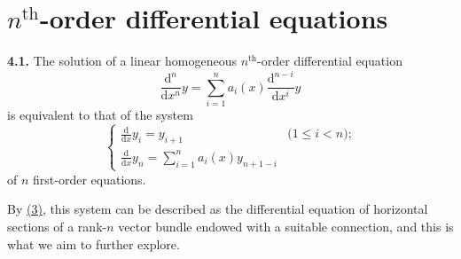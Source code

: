 \documentclass{report}
\newenvironment{rmenv}[1]
  {\phantomsection\par\medskip\noindent\textbf{#1.}\rmfamily}
  {\medskip}
\newcommand{\dd}{\mathrm{d}}
\renewcommand{\leq}{\leqslant}
\begin{document}
\section{\texorpdfstring{$n^\mathrm{th}$}{nth}-order differential equations}
\label{I.4}

\begin{rmenv}{4.1}
\label{I.4.1}
  The solution of a linear homogeneous $n^\mathrm{th}$-order differential equation
  \[
  \label{I.4.1.1}
    \frac{\dd^n}{\dd x^n}y = \sum_{i=1}^n a_i(x) \frac{\dd^{n-i}}{\dd x^i}y
  \tag{4.1.1}
  \]
  is equivalent to that of the system
  \[
  \label{I.4.1.2}
    \begin{cases}
      \frac{\dd}{\dd x}y_i
      = y_{i+1} &\mbox{($1\leq i<n$);}
    \\\frac{\dd}{\dd x}y_n
      = \sum_{i=1}^n a_i(x) y_{n+1-i}
    \end{cases}
  \tag{4.1.2}
  \]
  of $n$ first-order equations.

  By \hyperref[I.3]{(3)}, this system can be described as the differential equation of horizontal sections of a rank-$n$ vector bundle endowed with a suitable connection, and this is what we aim to further explore.
\end{rmenv}
\end{document}

